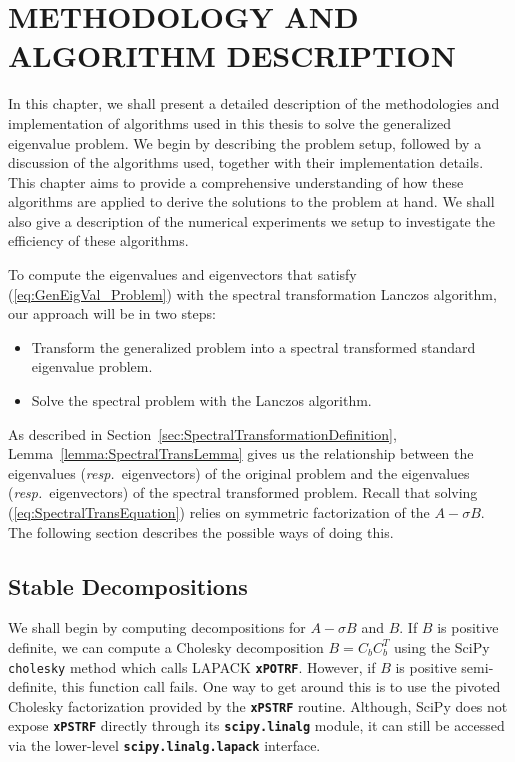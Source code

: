 \chapter{METHODOLOGY AND ALGORITHM DESCRIPTION}

In this chapter, we shall present a detailed description of the methodologies and implementation of algorithms used in this thesis to solve the generalized eigenvalue problem. We begin by describing the problem setup, followed by a discussion of the algorithms used, together with their implementation details. This chapter aims to provide a comprehensive understanding of how these algorithms are applied to derive the solutions to the problem at hand. We shall also give a description of the numerical experiments we setup to investigate the efficiency of these algorithms.

To compute the eigenvalues and eigenvectors that satisfy (\ref{eq:GenEigVal_Problem}) with the spectral transformation Lanczos algorithm, our approach will be in two steps:
\begin{itemize}
	\item[$\bullet$] Transform the generalized problem into a spectral transformed standard eigenvalue problem.
	\item[$\bullet$] Solve the spectral problem with the Lanczos algorithm.
\end{itemize}
As described in Section~\ref{sec:SpectralTransformationDefinition}, 
Lemma~\ref{lemma:SpectralTransLemma} gives us the relationship between the eigenvalues (\textit{resp.}\ eigenvectors) of the original problem and the eigenvalues (\textit{resp.}\ eigenvectors) of the spectral transformed problem. Recall that solving (\ref{eq:SpectralTransEquation}) relies on symmetric factorization of the $A - \sigma B$. The following section describes the possible ways of doing this.
\section{Stable Decompositions}\label{sec:StableDecompositions}
We shall begin by computing decompositions for $A - \sigma B$ and $B$. If $B$ is positive  definite, we can compute a Cholesky decomposition $B = C_bC_b^T$ using the SciPy \texttt{cholesky} method which calls LAPACK \textbf{\texttt{xPOTRF}}. However, if $B$ is positive semi-definite, this function call fails. One way to get around this is to use the pivoted Cholesky factorization provided by the \textbf{\texttt{xPSTRF}} routine. Although, SciPy does not expose \textbf{\texttt{xPSTRF}} directly through its \textbf{\texttt{scipy.linalg}} module, it can still be accessed via the lower-level \textbf{\texttt{scipy.linalg.lapack}} interface.

